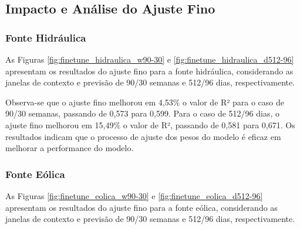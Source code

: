 \subsection{Impacto e Análise do Ajuste Fino}
\subsubsection{Fonte Hidráulica}
\begin{figure}[!ht]
  {}
  {}
\end{figure}
\begin{figure}[!ht]
  {}
  {}
\end{figure}
As Figuras \ref{fig:finetune_hidraulica_w90-30} e \ref{fig:finetune_hidraulica_d512-96} apresentam os resultados do ajuste fino
para a fonte hidráulica, considerando as janelas de contexto e previsão de 90/30 semanas e 512/96 dias, respectivamente.

Observa-se que o ajuste fino melhorou em 4,53\% o valor de R² para o caso de 90/30 semanas, passando de 0,573 para 0,599.
Para o caso de 512/96 dias, o ajuste fino melhorou em 15,49\% o valor de R², passando de 0,581 para 0,671. Os resultados 
indicam que o processo de ajuste dos pesos do modelo é eficaz em melhorar a performance do modelo.

\subsubsection{Fonte Eólica}
\begin{figure}[!ht]
  {}
  {}
\end{figure}
\begin{figure}[!ht]
  {}
  {}
\end{figure}
As Figuras \ref{fig:finetune_eolica_w90-30} e \ref{fig:finetune_eolica_d512-96} apresentam os resultados do ajuste fino
para a fonte eólica, considerando as janelas de contexto e previsão de 90/30 semanas e 512/96 dias, respectivamente.

